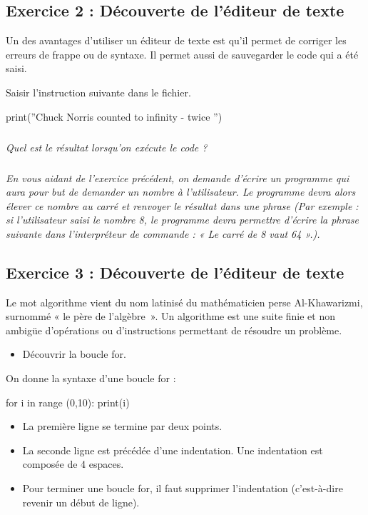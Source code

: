 \documentclass[10pt]{article}
\begin{document}
\subsection*{Exercice 2 : Découverte de l'éditeur de texte}
\setcounter{subparagraph}{0}
Un des avantages d’utiliser un éditeur de texte est qu’il permet de corriger les erreurs de frappe ou de syntaxe. Il permet aussi de sauvegarder le code qui a été saisi. 


\begin{py}
Saisir l'instruction suivante dans le fichier.
\begin{python}
print(''Chuck Norris counted to infinity - twice '')
\end{python}
\end{py}

\subparagraph{}
\textit{Quel est le résultat lorsqu’on exécute le code ?}

\subparagraph{}
\textit{En vous aidant de l’exercice précédent, on demande d’écrire un programme qui aura pour but de demander un nombre à l’utilisateur. Le programme devra alors élever ce nombre au carré et renvoyer le résultat dans une phrase (Par exemple : si l’utilisateur saisi le nombre 8, le programme devra permettre d’écrire la phrase suivante dans l’interpréteur de commande : « Le carré de 8 vaut 64 ».).}


\subsection*{Exercice 3 : Découverte de l'éditeur de texte}
\setcounter{subparagraph}{0}

\begin{defi}
Le mot algorithme vient du nom latinisé du mathématicien perse Al-Khawarizmi, surnommé « le père de l’algèbre~». Un algorithme est une suite finie et non ambigüe d’opérations ou d’instructions permettant de résoudre un problème.
\end{defi}

\begin{obj}
\begin{itemize}
\item Découvrir la boucle \textsf{for}.
\end{itemize}
\end{obj}

On donne la syntaxe d'une boucle \textsf{for} :

\begin{py}
\begin{python}
for i in range (0,10):
    print(i)
\end{python}
\end{py}
\begin{rem}
\begin{itemize}
\item La première ligne se termine par deux points.
\item La seconde ligne est précédée d’une indentation. Une indentation est composée de 4 espaces. 
\item Pour terminer une boucle \textsf{for}, il faut supprimer l’indentation (c'est-à-dire revenir un début de ligne). 
\end{itemize}
\end{rem}
\end{document}
